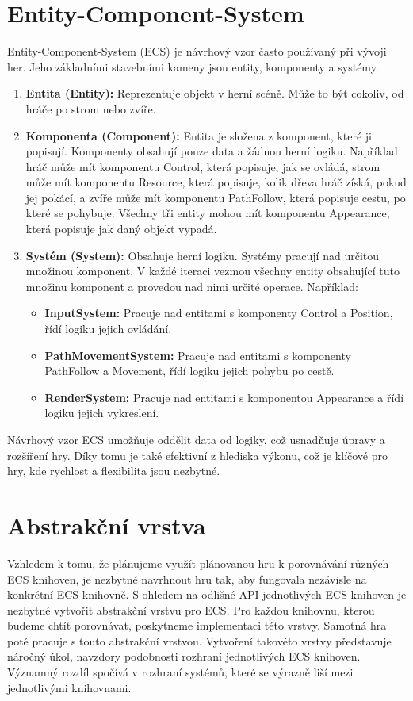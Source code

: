 \section{Entity-Component-System}
Entity-Component-System (ECS) je návrhový vzor často používaný při vývoji her. Jeho základními stavebními kameny jsou entity, komponenty a systémy.
\begin{enumerate}
    \item \textbf{Entita (Entity):} Reprezentuje objekt v herní scéně. Může to být cokoliv, od hráče po strom nebo zvíře.
    \item \textbf{Komponenta (Component):} Entita je složena z komponent, které ji popisují. Komponenty obsahují pouze data a žádnou herní logiku. Například hráč může mít komponentu Control, která popisuje, jak se ovládá, strom může mít komponentu Resource, která popisuje, kolik dřeva hráč získá, pokud jej pokácí, a zvíře může mít komponentu PathFollow, která popisuje cestu, po které se pohybuje. Všechny tři entity mohou mít komponentu Appearance, která popisuje jak daný objekt vypadá.
    \item \textbf{Systém (System):} Obsahuje herní logiku. Systémy pracují nad určitou množinou komponent. V každé iteraci vezmou všechny entity obsahující tuto množinu komponent a provedou nad nimi určité operace. Například:
    \begin{itemize}
        \item \textbf{InputSystem:} Pracuje nad entitami s komponenty Control a Position, řídí logiku jejich ovládání.
        \item \textbf{PathMovementSystem:} Pracuje nad entitami s komponenty PathFollow a Movement, řídí logiku jejich pohybu po cestě.
        \item \textbf{RenderSystem:} Pracuje nad entitami s komponentou Appearance a řídí logiku jejich vykreslení.
    \end{itemize}
\end{enumerate}
Návrhový vzor ECS umožňuje oddělit data od logiky, což usnadňuje úpravy a rozšíření hry. Díky tomu je také efektivní z hlediska výkonu, což je klíčové pro hry, kde rychlost a flexibilita jsou nezbytné.

\section{Abstrakční vrstva}
Vzhledem k tomu, že plánujeme využít plánovanou hru k porovnávání různých ECS knihoven, je nezbytné navrhnout hru tak, aby fungovala nezávisle na konkrétní ECS knihovně. S ohledem na odlišné API jednotlivých ECS knihoven je nezbytné vytvořit abstrakční vrstvu pro ECS. Pro každou knihovnu, kterou budeme chtít porovnávat, poskytneme implementaci této vrstvy. Samotná hra poté pracuje s touto abstrakční vrstvou. Vytvoření takovéto vrstvy představuje náročný úkol, navzdory podobnosti rozhraní jednotlivých ECS knihoven. Významný rozdíl spočívá v rozhraní systémů, které se výrazně liší mezi jednotlivými knihovnami.

